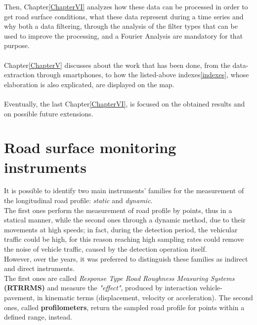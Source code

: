 \documentclass{standalone}
\begin{document}
Then, Chapter\ref{ChapterVI} analyzes how these data can be processed in order to get road surface conditions, what these data represent during a time series and why both a data filtering, through the analysis of the filter types that can be used to improve the processing, and a Fourier Analysis are mandatory for that purpose.\\\\
Chapter\ref{ChapterV} discusses about the work that has been done, from the data-extraction through smartphones, to how the listed-above indexes\ref{indexes}, whose elaboration is also explicated, are displayed on the map.\\\\
Eventually, the last Chapter\ref{ChapterVI}, is focused on the obtained results and on possible future extensions.
\clearpage
	\section{Road surface monitoring instruments}\label{Instruments}
\noindent It is possible to identify two main instruments' families for the measurement of the longitudinal road profile: \emph{static} and \emph{dynamic}.\\ The first ones perform the measurement of road profile by points, thus in a statical manner, while the second ones through a dynamic method, due to their movements at high speeds; in fact, during the detection period, the vehicular traffic could be high, for this reason reaching high sampling rates could remove the noise of vehicle traffic, caused by the detection operation itself.\\However, over the years, it was preferred to distinguish these families as indirect and direct instruments.\\ The first ones are called \textit{Response Type Road Roughness Measuring Systems} \textbf{(RTRRMS)} and measure the \textit{"effect"}, produced by interaction vehicle-pavement, in kinematic terms (displacement, velocity or acceleration). The second ones, called \textbf{profilometers}, return the sampled road profile for points within a defined range, instead.
\end{document}
